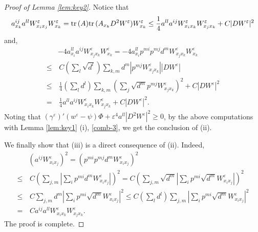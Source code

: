 \documentclass[12pt,reqno]{amsart}
\theoremstyle{plain}
\theoremstyle{remark}
\numberwithin{equation}{section}
\begin{document}
\begin{proof}[Proof of Lemma {\rm\ref{lem:key2}}]
Notice that 
\begin{align*}
a^{ij}_{x_k} a^{ll} W^{\varepsilon}_{x_i x_j} W^{\varepsilon}_{x_k}
={{\rm tr}\,}(A) {{\rm tr}\,}(A_{x_k} D^2W^{\varepsilon})W^{\varepsilon}_{x_k}
\leq
\frac{1}{4}a^{ll}a^{ij}W^{\varepsilon}_{x_ix_k}W^{\varepsilon}_{x_jx_k}+ C|DW^{\varepsilon}|^2
\end{align*}
and, 
\begin{align*}
&-4a^{ll}_{x_i}a^{ij}W^{\varepsilon}_{x_j x_k} W^{\varepsilon}_{x_k}
=-4a^{ll}_{x_i} p^{mi} p^{mj} d^m W^{\varepsilon}_{x_j x_k} W^{\varepsilon}_{x_k}\\  
\leq&\,
C \left(\sum_l \sqrt{d^l}\right)\sum_{k,m} d^m \left|  p^{mj} W^{\varepsilon}_{x_j x_k}\right| |DW^{\varepsilon}|\\
\leq &\,
\frac{1}{4}\left( \sum_{l} d^l \right) \sum_{k,m} \left ( \sum_j \sqrt{d^m} p^{mj}W^{\varepsilon}_{x_j x_k} \right)^2 +  C|DW^{\varepsilon}|^2\\
=&\,
\frac{1}{4}a^{ll}a^{ij}W^{\varepsilon}_{x_ix_k}W^{\varepsilon}_{x_jx_k}+ C|DW^{\varepsilon}|^2. 
\end{align*}
Noting that 
$({\gamma}^{\varepsilon})'(w^{\varepsilon}-\psi)\Phi+{\varepsilon}^4a^{ll}|D^2W^{\varepsilon}|^2\ge0$, 
by the above computations with 
Lemma \ref{lem:key1} (i), \eqref{comb-3}, 
we get the conclusion of (ii). 

We finally show that (iii) is a direct consequence of (ii). Indeed,
\begin{align*}
&\left(a^{ij}W^{\varepsilon}_{x_ix_j}\right)^2
=\left(p^{mi} p^{mj} d^m W^{\varepsilon}_{x_i x_j} \right)^2\\
\leq &\,
C\left(\sum_{j,m}\left|\sum_{i}p^{mi}d^m W^{\varepsilon}_{x_ix_j}\right| \right)^2
=C\left(\sum_{j,m}\sqrt{d^m}\left|\sum_{i}p^{mi}\sqrt{d^m} W^{\varepsilon}_{x_ix_j}\right| \right)^2\\
\leq &\,
C \sum_{j,m} d^m \left|\sum_{i}p^{mi}\sqrt{d^m} W^{\varepsilon}_{x_ix_j} \right|^2
\leq C \left(\sum_l d^l \right)  \sum_{j,m}  \left|\sum_{i}p^{mi}\sqrt{d^m} W^{\varepsilon}_{x_ix_j} \right|^2\\
=&\,
Ca^{ij} a^{ll} W^{\varepsilon}_{x_i x_k} W^{\varepsilon}_{x_j x_k}.
\end{align*}
The proof is complete.
\end{proof}
\end{document}
